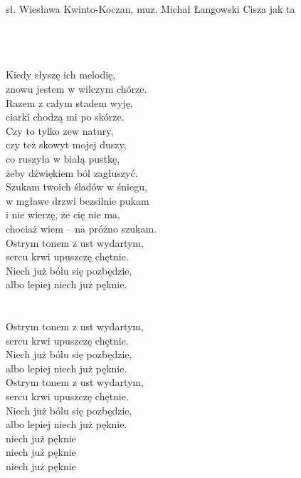 {sł. Wiesława Kwinto-Koczan, muz. Michał Łangowski}
{Cisza jak ta}
\begin{text}
\vin \\
\vin \\
\vin \\
Kiedy słyszę ich melodię,\\
znowu jestem w wilczym chórze.\\
Razem z całym stadem wyję,\\
ciarki chodzą mi po skórze.\\

Czy to tylko zew natury,\\
czy też skowyt mojej duszy,\\
co ruszyła w białą pustkę,\\
żeby dźwiękiem ból zagłuszyć.\\

Szukam twoich śladów w śniegu,\\
w mgławe drzwi bezsilnie pukam\\
i nie wierzę, że cię nie ma,\\
chociaż wiem – na próżno szukam.\\

Ostrym tonem z ust wydartym,\\
sercu krwi upuszczę chętnie.\\
Niech już bólu się pozbędzie,\\
albo lepiej niech już pęknie.\\
\vin \\
\vin \\

Ostrym tonem z ust wydartym,\\
sercu krwi upuszczę chętnie.\\
Niech już bólu się pozbędzie,\\
albo lepiej niech już pęknie.\\

Ostrym tonem z ust wydartym,\\
sercu krwi upuszczę chętnie.\\
Niech już bólu się pozbędzie,\\
albo lepiej niech już pęknie.\\
niech już pęknie\\
niech już pęknie\\
niech już pęknie\\
\end{text}
